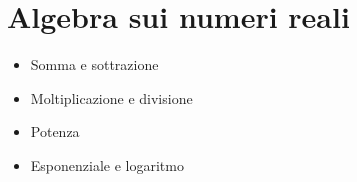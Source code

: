 \documentclass[letterpaper,10pt,italian]{jupyterBook}
\begin{document}
\chapter{Algebra sui numeri reali}
\label{\detokenize{ch/algebra/real-algebra:algebra-sui-numeri-reali}}\label{\detokenize{ch/algebra/real-algebra:math-hs-algebra-real}}\label{\detokenize{ch/algebra/real-algebra::doc}}
\sphinxAtStartPar
{}

\sphinxAtStartPar
{}
\begin{itemize}
\item {} 
\sphinxAtStartPar
Somma e sottrazione

\item {} 
\sphinxAtStartPar
Moltiplicazione e divisione

\item {} 
\sphinxAtStartPar
Potenza

\item {} 
\sphinxAtStartPar
Esponenziale e logaritmo

\end{itemize}

\sphinxAtStartPar
{}

\sphinxstepscope
\end{document}
